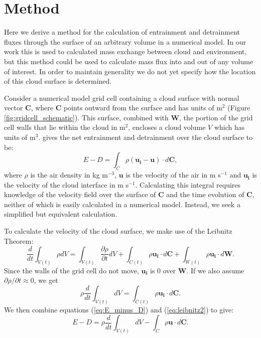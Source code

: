 \documentclass[12pt]{article}
\begin{document}

\section{Method}

Here we derive a method for the calculation of entrainment and detrainment
fluxes through the surface of an arbitrary volume in a numerical model.  In our 
work this is used to calculated mass exchange between cloud and environment, 
but this method could be used to calculate mass flux into and out of any volume 
of interest.  In order to maintain generality we do not yet specify how the 
location of this cloud surface is determined.

Consider a numerical model grid cell containing a cloud surface with normal 
vector $\mathbf{C}$, where $\mathbf{C}$ points outward from the surface and 
has units of m$^2$ (Figure \ref{fig:gridcell_schematic}).  This surface, 
combined with $\mathbf{W}$, the portion of the grid cell walls that lie within 
the cloud in m$^2$, encloses a cloud volume $V$ which has units of m$^3$.  
\cite{Siebesma1998} gives the net entrainment and detrainment over the cloud 
surface to be:
\begin{equation}
\label{eq:E_minus_D} 
E - D = \int_C \rho ( \mathbf{u_i} -  \mathbf{u}) \cdot d\mathbf{C},
\end{equation}
where $\rho$ is the air density in kg m$^{-3}$, $\mathbf{u}$ is the velocity
of the air in m s$^{-1}$ and $\mathbf{u_i}$ is the velocity of the cloud 
interface in m s$^{-1}$.  Calculating this integral requires knowledge of the 
velocity field over the surface of $\mathbf{C}$ and the time evolution of 
$\mathbf{C}$, neither of which is easily calculated in a numerical model.  
Instead, we seek a simplified but equivalent calculation.

To calculate the velocity of the cloud surface, we make use of the Leibnitz 
Theorem:
\begin{equation}
\label{eq:leibnitz} 
\frac{d}{dt}\int_{V(t)} \rho dV = 
  \int_{V(t)} \frac{\partial \rho}{ \partial t} dV 
  + \int_{C(t)} \rho \mathbf{u_i}\cdot d\mathbf{C}
  + \int_{W(t)} \rho \mathbf{u_i}\cdot d\mathbf{W}.
\end{equation}
Since the walls of the grid cell do not move, $\mathbf{u_i}$ is 0 over 
$\mathbf{W}$.  If we also assume ${\partial \rho}/{ \partial t} \approx 0$, we
get
\begin{equation}
\label{eq:leibnitz2} 
    \rho \frac{d}{dt}\int_{V(t)} dV = 
    \int_{C(t)} \rho \mathbf{u_i}\cdot d\mathbf{C}.
\end{equation}
We then combine equations (\ref{eq:E_minus_D}) and (\ref{eq:leibnitz2}) to give:
\begin{equation}
\label{eq:step1} 
      E - D = \rho \frac{d}{dt}\int_{V(t)} dV
            - \int_C \rho \mathbf{u} \cdot d\mathbf{C}.
\end{equation}
\end{document}
